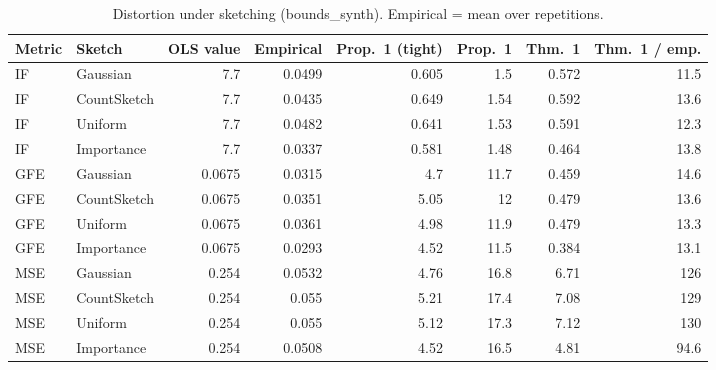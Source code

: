 \begin{table}[t]
\centering
\small
\begin{tabular}{llrrrrrr}
\toprule
Metric & Sketch & OLS value & Empirical & Prop.~1 (tight) & Prop.~1 & Thm.~1 & Thm.~1 / emp. \\
\midrule
IF & Gaussian & 7.7 & 0.0499 & 0.605 & 1.5 & 0.572 & 11.5 \\
IF & CountSketch & 7.7 & 0.0435 & 0.649 & 1.54 & 0.592 & 13.6 \\
IF & Uniform & 7.7 & 0.0482 & 0.641 & 1.53 & 0.591 & 12.3 \\
IF & Importance & 7.7 & 0.0337 & 0.581 & 1.48 & 0.464 & 13.8 \\
\midrule
GFE & Gaussian & 0.0675 & 0.0315 & 4.7 & 11.7 & 0.459 & 14.6 \\
GFE & CountSketch & 0.0675 & 0.0351 & 5.05 & 12 & 0.479 & 13.6 \\
GFE & Uniform & 0.0675 & 0.0361 & 4.98 & 11.9 & 0.479 & 13.3 \\
GFE & Importance & 0.0675 & 0.0293 & 4.52 & 11.5 & 0.384 & 13.1 \\
\midrule
MSE & Gaussian & 0.254 & 0.0532 & 4.76 & 16.8 & 6.71 & 126 \\
MSE & CountSketch & 0.254 & 0.055 & 5.21 & 17.4 & 7.08 & 129 \\
MSE & Uniform & 0.254 & 0.055 & 5.12 & 17.3 & 7.12 & 130 \\
MSE & Importance & 0.254 & 0.0508 & 4.52 & 16.5 & 4.81 & 94.6 \\
\bottomrule
\end{tabular}
\caption{Distortion under sketching (bounds_synth). Empirical = mean over repetitions.}
\label{tab:bounds_synth}
\end{table}